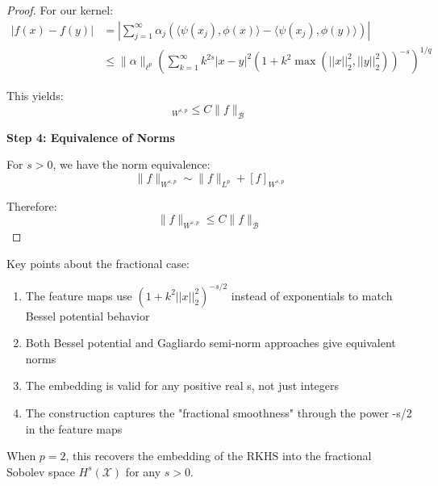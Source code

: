 \begin{proof}
For our kernel:
\begin{align}
|f(x)-f(y)| &= \left|\sum_{j=1}^\infty \alpha_j (\langle \psi(x_j), \phi(x)\rangle - \langle \psi(x_j), \phi(y)\rangle)\right| \\
&\leq \|\alpha\|_{\ell^p} \left(\sum_{k=1}^\infty k^{2s}|x-y|^2(1 + k^2\max(||x||_2^2,||y||_2^2))^{-s}\right)^{1/q}
\end{align}

This yields:
\begin{equation}
[f]_{W^{s,p}} \leq C\|f\|_{\mathcal{B}}
\end{equation}

\textbf{Step 4: Equivalence of Norms}

For $s > 0$, we have the norm equivalence:
\begin{equation}
\|f\|_{W^{s,p}} \sim \|f\|_{L^p} + [f]_{W^{s,p}}
\end{equation}

Therefore:
\begin{equation}
\|f\|_{W^{s,p}} \leq C\|f\|_{\mathcal{B}}
\end{equation}
\end{proof}

\begin{remark}
Key points about the fractional case:
\begin{enumerate}
\item The feature maps use $(1 + k^2||x||_2^2)^{-s/2}$ instead of exponentials to match Bessel potential behavior
\item Both Bessel potential and Gagliardo semi-norm approaches give equivalent norms
\item The embedding is valid for any positive real s, not just integers
\item The construction captures the "fractional smoothness" through the power -s/2 in the feature maps
\end{enumerate}
\end{remark}

\begin{corollary}
When $p=2$, this recovers the embedding of the RKHS into the fractional Sobolev space $H^s(\mathcal{X})$ for any $s > 0$.
\end{corollary}



